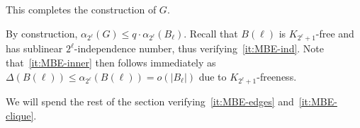\documentclass[10pt,a4paper]{article}
\theoremstyle{definition}
\begin{document}
\medskip

This completes the construction of $G$.

\medskip

By construction, $\alpha_{2^{\ell}}(G)\le q\cdot\alpha_{2^{\ell}}(B_{\ell})$. Recall that $B(\ell)$ is $K_{2^{\ell}+1}$-free and has sublinear $2^{\ell}$-independence number, thus verifying~\ref{it:MBE-ind}. Note that~\ref{it:MBE-inner} then follows immediately as $\Delta(B(\ell))\le\alpha_{2^\ell}(B(\ell))=o(|B_{\ell}|)$ due to $K_{2^{\ell}+1}$-freeness.

We will spend the rest of the section verifying~\ref{it:MBE-edges} and~\ref{it:MBE-clique}.






\end{document}
